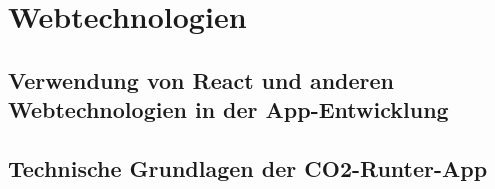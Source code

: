 \section{Webtechnologien}

\subsection{Verwendung von React und anderen Webtechnologien in der App-Entwicklung}

\subsection{Technische Grundlagen der CO2-Runter-App}
